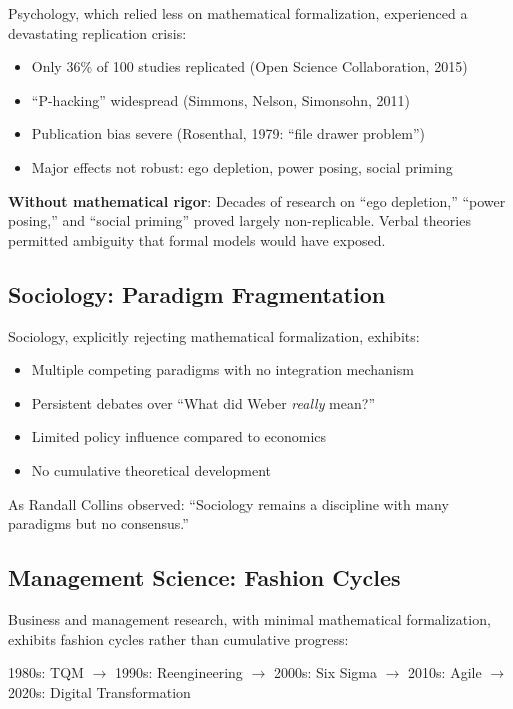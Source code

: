 \documentclass[12pt,a4paper]{article}
\begin{document}
Psychology, which relied less on mathematical formalization, experienced a devastating replication crisis:
\begin{itemize}
\item Only 36\% of 100 studies replicated (Open Science Collaboration, 2015)
\item ``P-hacking'' widespread (Simmons, Nelson, Simonsohn, 2011)
\item Publication bias severe (Rosenthal, 1979: ``file drawer problem'')
\item Major effects not robust: ego depletion, power posing, social priming
\end{itemize}

\textbf{Without mathematical rigor}: Decades of research on ``ego depletion,'' ``power posing,'' and ``social priming'' proved largely non-replicable. Verbal theories permitted ambiguity that formal models would have exposed.

\subsection{Sociology: Paradigm Fragmentation}

Sociology, explicitly rejecting mathematical formalization, exhibits:
\begin{itemize}[nosep]
\item Multiple competing paradigms with no integration mechanism
\item Persistent debates over ``What did Weber \textit{really} mean?''
\item Limited policy influence compared to economics
\item No cumulative theoretical development
\end{itemize}

As Randall Collins observed: ``Sociology remains a discipline with many paradigms but no consensus.''

\subsection{Management Science: Fashion Cycles}

Business and management research, with minimal mathematical formalization, exhibits fashion cycles rather than cumulative progress:
\begin{center}
1980s: TQM $\to$ 1990s: Reengineering $\to$ 2000s: Six Sigma $\to$ 2010s: Agile $\to$ 2020s: Digital Transformation
\end{center}
\end{document}
